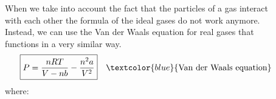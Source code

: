 \documentclass[main.tex]{subfiles}
\begin{document}
\begin{description}
\item[] 
When we take into account the fact that the particles of a gas interact with each other the formula of the ideal gases do not work anymore. Instead, we can use the Van der Waals equation for real gases that functions in a very similar way.
\begin{equation*}\begin{split}
\boxed{  P=\frac{nRT}{V-nb}-\frac{n^2a}{V^2}} \quad \textcolor{blue}{\text{Van der Waals equation}}
\end{split}\end{equation*}
where:


\end{description}
\end{document}
